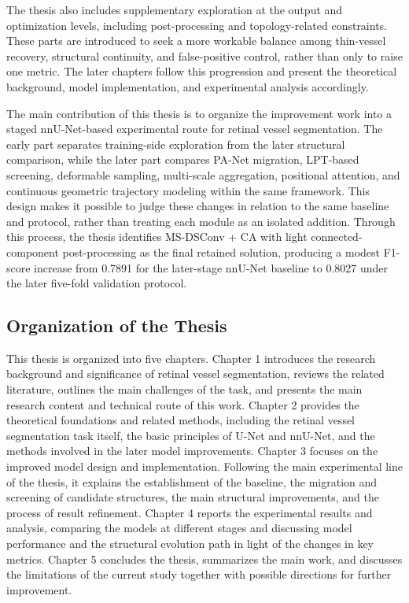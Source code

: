 \documentclass[a4paper,11pt]{article}
\begin{document}
The thesis also includes supplementary exploration at the output and optimization levels, including post-processing and topology-related constraints. These parts are introduced to seek a more workable balance among thin-vessel recovery, structural continuity, and false-positive control, rather than only to raise one metric. The later chapters follow this progression and present the theoretical background, model implementation, and experimental analysis accordingly.

The main contribution of this thesis is to organize the improvement work into a staged nnU-Net-based experimental route for retinal vessel segmentation.
The early part separates training-side exploration from the later structural comparison, while the later part compares PA-Net migration, LPT-based screening, deformable sampling, multi-scale aggregation, positional attention, and continuous geometric trajectory modeling within the same framework.
This design makes it possible to judge these changes in relation to the same baseline and protocol, rather than treating each module as an isolated addition.
Through this process, the thesis identifies MS-DSConv + CA with light connected-component post-processing as the final retained solution, producing a modest F1-score increase from 0.7891 for the later-stage nnU-Net baseline to 0.8027 under the later five-fold validation protocol.

\subsection{Organization of the Thesis}
This thesis is organized into five chapters. Chapter 1 introduces the research background and significance of retinal vessel segmentation, reviews the related literature, outlines the main challenges of the task, and presents the main research content and technical route of this work. Chapter 2 provides the theoretical foundations and related methods, including the retinal vessel segmentation task itself, the basic principles of U-Net and nnU-Net, and the methods involved in the later model improvements. Chapter 3 focuses on the improved model design and implementation. Following the main experimental line of the thesis, it explains the establishment of the baseline, the migration and screening of candidate structures, the main structural improvements, and the process of result refinement. Chapter 4 reports the experimental results and analysis, comparing the models at different stages and discussing model performance and the structural evolution path in light of the changes in key metrics. Chapter 5 concludes the thesis, summarizes the main work, and discusses the limitations of the current study together with possible directions for further improvement.
\end{document}
